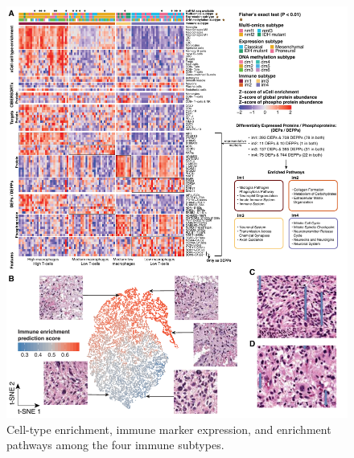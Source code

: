 \begin{figure}[p]
    \centering
    \includegraphics[width=\linewidth]{figures/chap04_cptac_gbm_discov/figure4_immune.pdf}
    \caption[Cell-type enrichment, immune marker expression, and enrichment pathways among the four immune subtypes.]{%
        Cell-type enrichment, immune marker expression, and enrichment pathways among the four immune subtypes.
        \legendcontdnote
    }
    \label{fig:gbm-immune}
\end{figure}
